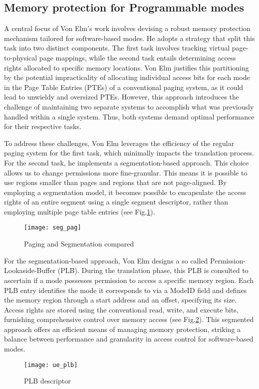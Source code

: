 \subsection{Memory protection for Programmable modes}\label{chap:mem_perm}
A central focus of Von Elm's work involves devising a robust memory protection
mechanism tailored for software-based modes. He adopts a strategy that
split this task into two distinct components. The first task involves
tracking virtual page-to-physical page mappings, while the second task entails
determining access rights allocated to specific memory locations. Von Elm
justifies this partitioning by the potential impracticality of allocating
individual access bits for each mode in the Page Table Entries (PTEs) of a
conventional paging system, as it could lead to unwieldy and oversized PTEs.
However, this approach introduces the challenge of maintaining two separate
systems to accomplish what was previously handled within a single system.
Thus, both systems demand optimal performance for their respective tasks.\par
To address these challenges, Von Elm leverages the efficiency of the regular
paging system for the first task, which minimally impacts the translation
process. For the second task, he implements a segmentation-based approach.
This choice allows us to change permissions more fine-granular. This means it is
possible to use regions smaller than pages and regions that are not
page-aligned. By employing a segmentation model, it becomes possible to
encapsulate the access rights of an entire segment using a single segment
descriptor, rather than employing multiple page table entries (see Fig.\ref{fig:pag_seg}).\par 
\begin{figure}[h]
    \centering
    \texttt{[image: seg\_pag]}
    \caption{Paging and Segmentation compared}
    \label{fig:pag_seg}
\end{figure}
For the segmentation-based approach, Von Elm designs a so called
Permission-Lookaside-Buffer (PLB). During the translation phase, this PLB is
consulted to ascertain if a mode possesses permission to access a specific
memory region. Each PLB entry identifies the mode it corresponds to via a ModeID
field and defines the memory region through a start address and an offset,
specifying its size. Access rights are stored using the conventional read,
write, and execute bits, furnishing comprehensive control over memory access
(see Fig.\ref{fig:plb_desc}). This segmented approach offers an efficient means
of managing memory protection, striking a balance between performance and
granularity in access control for software-based modes.
\begin{figure}[h]
    \centering
    \texttt{[image: ue\_plb]}
    \caption{PLB descriptor}
    \label{fig:plb_desc}
\end{figure}